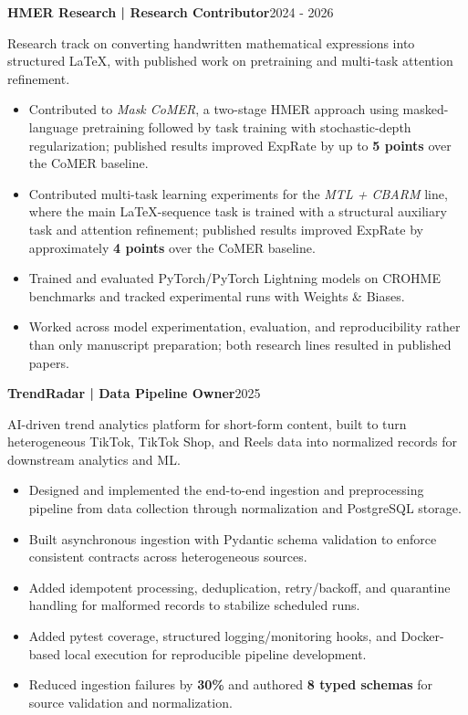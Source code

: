 \documentclass[10pt]{article}
\newcommand{\entry}[2]{%
    \textbf{#1}\hfill {\color{muted}\small #2}\par
}
\newcommand{\subentry}[1]{%
    {\color{muted}\small #1}\par
}
\begin{document}
\entry{HMER Research | Research Contributor}{2024 - 2026}
\subentry{Research track on converting handwritten mathematical expressions into structured LaTeX, with published work on pretraining and multi-task attention refinement.}
\begin{itemize}
    \item Contributed to \textit{Mask CoMER}, a two-stage HMER approach using masked-language pretraining followed by task training with stochastic-depth regularization; published results improved ExpRate by up to \textbf{5 points} over the CoMER baseline.
    \item Contributed multi-task learning experiments for the \textit{MTL + CBARM} line, where the main LaTeX-sequence task is trained with a structural auxiliary task and attention refinement; published results improved ExpRate by approximately \textbf{4 points} over the CoMER baseline.
    \item Trained and evaluated PyTorch/PyTorch Lightning models on CROHME benchmarks and tracked experimental runs with Weights \& Biases.
    \item Worked across model experimentation, evaluation, and reproducibility rather than only manuscript preparation; both research lines resulted in published papers.
\end{itemize}

\entry{TrendRadar | Data Pipeline Owner}{2025}
\subentry{AI-driven trend analytics platform for short-form content, built to turn heterogeneous TikTok, TikTok Shop, and Reels data into normalized records for downstream analytics and ML.}
\begin{itemize}
    \item Designed and implemented the end-to-end ingestion and preprocessing pipeline from data collection through normalization and PostgreSQL storage.
    \item Built asynchronous ingestion with Pydantic schema validation to enforce consistent contracts across heterogeneous sources.
    \item Added idempotent processing, deduplication, retry/backoff, and quarantine handling for malformed records to stabilize scheduled runs.
    \item Added pytest coverage, structured logging/monitoring hooks, and Docker-based local execution for reproducible pipeline development.
    \item Reduced ingestion failures by \textbf{30\%} and authored \textbf{8 typed schemas} for source validation and normalization.
\end{itemize}
\end{document}
